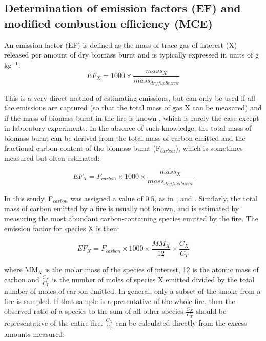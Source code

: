 \documentclass[acp, manuscript]{copernicus}
\begin{document}
\subsection{Determination of emission factors (EF) and modified combustion efficiency (MCE)}
An emission factor (EF) is defined as the mass of trace gas of interest (X) released per amount of dry biomass burnt and is typically expressed in units of g kg$^{-1}$:
\begin{equation} \label{eq:EF:mass_ratio}
EF_X = 1000 \times \frac{mass_X}{mass_{dry fuel burnt}}
\end{equation}

This is a very direct method of estimating emissions, but can only be used if all the emissions are captured (so that the total mass of gas X can be measured) and if the mass of biomass burnt in the fire is known \citep{Andreae2001}, which is rarely the case except in laboratory experiments. In the absence of such knowledge, the total mass of biomass burnt can be derived from the total mass of carbon emitted and the fractional carbon content of the biomass burnt (F$_{carbon}$), which is sometimes measured but often estimated:

\begin{equation} \label{eq:EF:Fc_mass_ratio}
EF_X = F_{carbon} \times 1000 \times \frac{mass_X}{mass_{dry fuel burnt}}
\end{equation}

In this study, F$_{carbon}$ was assigned a value of 0.5, as in \citet{Akagi2011},\citet{Yokelson2011} and \citet{Paton-Walsh2014}. Similarly, the total mass of carbon emitted by a fire is usually not known, and is estimated by measuring the most abundant carbon-containing species emitted by the fire. The emission factor for species X is then:

\begin{equation} \label{eq:EF:cx_ct}
EF_X = F_{carbon} \times 1000 \times \frac{MM_X}{12} \times \frac{C_X}{C_T}
\end{equation}

where MM$_X$ is the molar mass of the species of interest, 12 is the atomic mass of carbon and $ \frac{C_X}{C_T} $ is the number of moles of species X emitted divided by the total number of moles of carbon emitted. In general, only a subset of the smoke from a fire is sampled. If that sample is representative of the whole fire, then the observed ratio of a species to the sum of all other species  $ \frac{C_X}{C_T} $ should be representative of the entire fire.  $ \frac{C_X}{C_T} $ can be calculated directly from the excess amounts measured:
\end{document}
